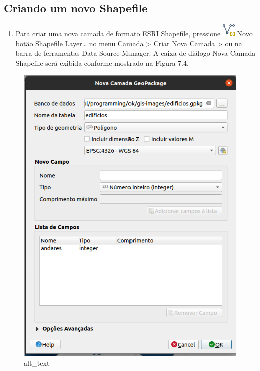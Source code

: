 \documentclass[
  portuguese,
]{krantz}
\providecommand{\tightlist}{%
  \setlength{\itemsep}{0pt}\setlength{\parskip}{0pt}}
\begin{document}
\hypertarget{criando-um-novo-shapefile}{%
\subsection{\texorpdfstring{\textbf{Criando um novo Shapefile}}{Criando um novo Shapefile}}\label{criando-um-novo-shapefile}}

\begin{enumerate}
\def\labelenumi{\arabic{enumi}.}
\tightlist
\item
  Para criar uma nova camada de formato ESRI Shapefile, pressione \includegraphics{media/modulo7/mActionNewVectorLayer.png} Novo botão Shapefile Layer\ldots{} no menu Camada \textgreater{} Criar Nova Camada \textgreater{} ou na barra de ferramentas Data Source Manager. A caixa de diálogo Nova Camada Shapefile será exibida conforme mostrado na Figura 7.4.
\end{enumerate}

\begin{figure}
\centering
\includegraphics{media/modulo7/new-shapefile-dialog.png}
\caption{alt\_text}
\end{figure}
\end{document}
